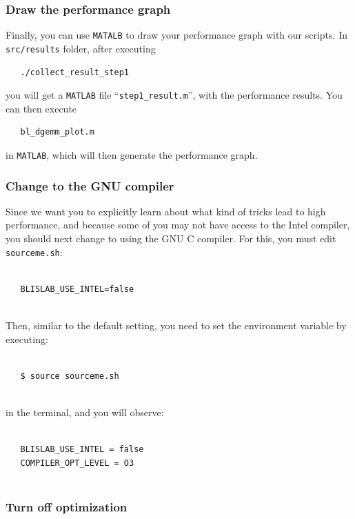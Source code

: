 \subsubsection{Draw the performance graph}

Finally, you can use {\tt MATALB} to draw your performance graph with our scripts. In {\tt src/results} folder, after executing 
\begin{verbatim}
   ./collect_result_step1
\end{verbatim}
you will get a {\tt MATLAB} file ``{\tt step1\_result.m}'', with the performance results. You can then execute 
\begin{verbatim}
   bl_dgemm_plot.m
\end{verbatim}
in {\tt MATLAB}, which will then generate the performance graph. %

\subsubsection{Change to the GNU compiler}

Since we want you to explicitly learn about what kind of tricks lead to high performance, and because some of you may not have access to the Intel compiler, you should next change to using the GNU C compiler.
For this, you must edit {\tt sourceme.sh}: 
\begin{verbatim}

   BLISLAB_USE_INTEL=false
   
\end{verbatim}
Then, similar to the default setting, you need to set the environment variable by executing:
\begin{verbatim}

   $ source sourceme.sh
   
\end{verbatim}
in the terminal, and you will observe:
\begin{verbatim}

   BLISLAB_USE_INTEL = false
   COMPILER_OPT_LEVEL = O3
   
\end{verbatim}

\subsubsection{Turn off optimization}


